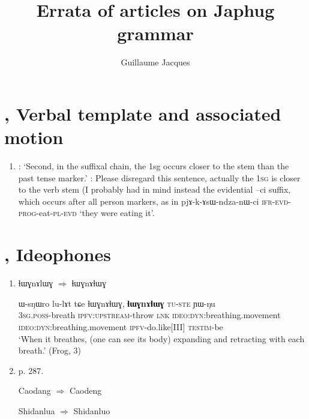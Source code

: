 \documentclass[oldfontcommands,oneside,a4paper,11pt]{article}
\newcommand{\ipa}[1]{{\phon \mbox{#1}}} %
\begin{document}
 
\title{Errata of articles on Japhug grammar}
\author{Guillaume Jacques}
\maketitle

\section{\citet{jacques13harmonization}, Verbal template and associated motion}
\begin{enumerate}
\item \citet[199]{jacques13harmonization}: `Second, in the suffixal chain, the 1sg occurs closer to the stem than the past tense marker.' : Please disregard this sentence, actually the \textsc{1sg} is closer to the verb stem (I probably had in mind instead the evidential \ipa{--ci} suffix, which occurs after all person markers, as in \ipa{pjɤ-k-ɤsɯ-ndza-nɯ-ci} \textsc{ifr-evd-prog}-eat-\textsc{pl-evd} `they were eating it'. 

\end{enumerate}

\section{\citet{japhug14ideophones}, Ideophones}
\begin{enumerate}
\item \citet[273, ex. 27]{japhug14ideophones} \ipa{ɬɯɣnɤlɯɣ} $\Rightarrow$ \ipa{ɬɯɣnɤɬɯɣ}
\begin{exe}
\ex \label{ex:lhWG.nA.lhWG}
\gll
\ipa{ɯ-sŋɯro} 	\ipa{lu-lɤt} 	\ipa{tɕe} 	\ipa{ɬɯɣnɤɬɯɣ,} 	\ipa{\textbf{ɬɯɣnɤɬɯɣ}} 	\textsc{\ipa{tu-ste}} 	\ipa{ɲɯ-ŋu} \\
\textsc{3sg.poss}-breath \textsc{ipfv:upstream}-throw \textsc{lnk} \textsc{ideo:dyn}:breathing.movement \textsc{ideo:dyn}:breathing.movement \textsc{ipfv}-do.like[III] \textsc{testim}-be \\
\glt `When it breathes, (one can see its body) expanding and retracting with each breath.' (Frog, 3)
\end{exe}

\item p. 287. 

Caodang   $\Rightarrow$ Caodeng


Shidanlua   $\Rightarrow$ Shidanluo
\end{enumerate}
\end{document}
